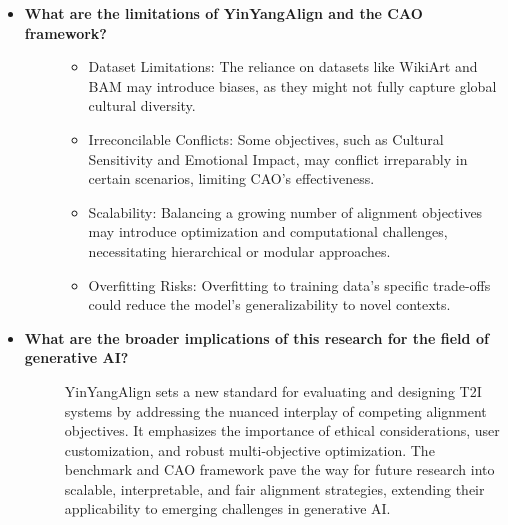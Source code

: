 \begin{itemize}[leftmargin=15pt,nolistsep]
\item[\ding{93}] { \selectfont \textbf{What are the limitations of YinYangAlign and the CAO framework?}}
\vspace{0mm}
\begin{description}
\item[] 
\begin{itemize}
    \item Dataset Limitations: The reliance on datasets like WikiArt and BAM may introduce biases, as they might not fully capture global cultural diversity.
    \item Irreconcilable Conflicts: Some objectives, such as Cultural Sensitivity and Emotional Impact, may conflict irreparably in certain scenarios, limiting CAO's effectiveness.
    \item Scalability: Balancing a growing number of alignment objectives may introduce optimization and computational challenges, necessitating hierarchical or modular approaches.
    \item Overfitting Risks: Overfitting to training data's specific trade-offs could reduce the model's generalizability to novel contexts.
\end{itemize}

\end{description}

\item[\ding{93}] { \selectfont \textbf{What are the broader implications of this research for the field of generative AI?}}
\vspace{0mm}
\begin{description}
\item[] YinYangAlign sets a new standard for evaluating and designing T2I systems by addressing the nuanced interplay of competing alignment objectives. It emphasizes the importance of ethical considerations, user customization, and robust multi-objective optimization. The benchmark and CAO framework pave the way for future research into scalable, interpretable, and fair alignment strategies, extending their applicability to emerging challenges in generative AI.
\end{description}


   
\end{itemize}





\twocolumn
\newpage
